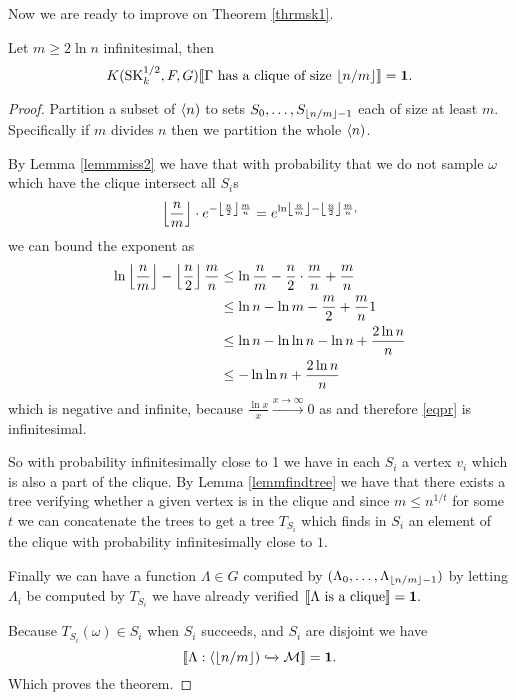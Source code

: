 Now we are ready to improve on Theorem \ref{thrmsk1}.

\begin{thrm}
Let $m\geq 2 \ln n$ infinitesimal, then
\[K(\text{SK}_k^{1/2},F,G)\llbracket\text{$\Gamma$ has a clique of size $\left \lfloor {n/m} \right \rfloor$}\rrbracket=\textbf{1}.\]
\end{thrm}
\begin{proof}
Partition a subset of $\langle n)$ to sets $S_{0},\dots,S_{\left \lfloor {n/m} \right \rfloor-1}$ each of size at least $m$. Specifically if $m$ divides $n$ then we partition the whole $\langle n)$.

By Lemma \ref{lemmmiss2} we have that with probability that we do not sample $\omega$ which have the clique intersect all $S_i$s 
\begin{align}
\left \lfloor {\frac{n}{m}} \right \rfloor\cdot e^{-\left \lfloor {\frac{n}{2}} \right \rfloor\frac{m}{n}} = e^{\ln\left \lfloor {\frac{n}{m}} \right \rfloor-\left \lfloor {\frac{n}{2}} \right \rfloor\frac{m}{n},}\label{eqpr}
\end{align}
we can bound the exponent as
\begin{align}
\ln\left \lfloor {\frac{n}{m}} \right \rfloor-\left \lfloor {\frac{n}{2}} \right \rfloor\frac{m}{n}&\leq\ln\frac{n}{m}-\frac{n}{2}\cdot\frac{m}{n}+\frac{m}{n}\\
&\leq\ln n - \ln m - \frac{m}{2} + \frac{m}{n}1\\
&\leq \ln n - \ln \ln n - \ln n+\frac{2\ln n}{n}\\
&\leq - \ln \ln n + \frac{2\ln n}{n}
\end{align}
which is negative and infinite, because $\frac{\ln x}{x}\overset{x\to \infty}{\to} 0$ as  and therefore \eqref{eqpr} is infinitesimal.

So with probability infinitesimally close to 1 we have in each $S_i$ a vertex $v_i$ which is also a part of the clique. By Lemma \ref{lemmfindtree} we have that there exists a tree verifying whether a given vertex is in the clique and since $m\leq n^{1/t}$ for some $t$ we can concatenate the trees to get a tree $T_{S_i}$ which finds in $S_i$ an element of the clique with probability infinitesimally close to $1$.

Finally we can have a function $\Lambda\in G$ computed by $(\Lambda_0,\dots,\Lambda_{\left \lfloor {n/m} \right \rfloor-1})$ by letting $\Lambda_i$ be computed by $T_{S_i}$ we have already verified $\llbracket\Lambda\text{ is a clique}\rrbracket=\textbf{1}.$

Because $T_{S_i}(\omega)\in S_i$ when $S_i$ succeeds, and $S_i$ are disjoint we have \[\llbracket\Lambda:\langle \left \lfloor {n/m} \right \rfloor)\xhookrightarrow{} \mathcal{M}\rrbracket=\textbf{1}. \]
Which proves the theorem.
\end{proof}


